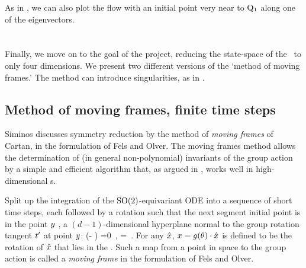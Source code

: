 {As in , we can also plot the flow
with an initial point very near to
$\mathrm{Q}_{1}$ along one of the eigenvectors.

\section{\Reducedsp}
\label{sect:reducedStateSp}

Finally, we move on to the goal of the project, reducing the
state-space of the \cLe\ to only four dimensions. We present
two different versions of the `method of moving frames.' The
method can introduce singularities, as in
.

\subsection{Method of moving frames, finite time steps}
\label{sect:MovFrame}


Siminos discusses symmetry reduction by the
method of {\em moving frames} of Cartan, in the
formulation of Fels and
Olver.
The moving frames method allows the determination of (in
general non-polynomial) invariants of the group action by a
simple and efficient algorithm that, as argued in
, works well in high-dimensional \statesp s.

Split up the integration of the $\textrm{SO}(2)$-equivariant ODE into
a sequence of short time steps, each followed by a rotation
such that the next segment initial point is in the point
$y$ {\slice}, a $(d\!-\!1)$-dimensional hyperplane
normal to the group rotation tangent $t'_{}$ at point
$y$:
\beq
(\ssp- \sspRed) \cdot \sliceTan{}=0
    \,,\qquad
\sliceTan{} = \Lg \cdot \sspRed
\,.
For any $\hat{x}$, $x =
g({\bf \theta})\cdot\hat{x}$ is defined to be the
rotation of $\hat{x}$ that lies in the \slice. Such a
map from a point in space to the group action is called a
\emph{moving frame} in the formulation of Fels and
Olver.

}
